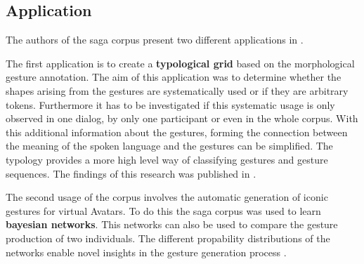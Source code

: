 \documentclass[a4paper]{article}
\begin{document}
		\subsection{Application}
			The authors of the \gls{saga} corpus present two different applications in \cite[ch. 4]{Bielefeld2010}.
			
			The first application is to create a \textbf{typological grid} based on the morphological gesture annotation. The aim of this application was to determine whether the shapes arising from the gestures are systematically used or if they are arbitrary tokens. Furthermore it has to be investigated if this systematic usage is only observed in one dialog, by only one participant or even in the whole corpus. With this additional information about the gestures, forming the connection between the meaning of the spoken language and the gestures can be simplified. The typology provides a more high level way of classifying gestures and gesture sequences. The findings of this research was published in \cite{Hahn2010}.
			
			The second usage of the corpus involves the automatic generation of iconic gestures for virtual Avatars. To do this the \gls{saga} corpus was used to learn \textbf{bayesian networks}. This networks can also be used to compare the gesture production of two individuals. The different propability distributions of the networks enable novel insights in the gesture generation process \cite[ch. 4.2]{Bielefeld2010}.
		

  	\newpage
  	\eightpt
  	

  	
\end{document}
